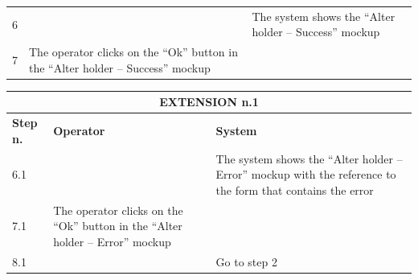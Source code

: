 {{{\begin{center}
\begin{tabular}{|p{2cm}|p{6cm}|p{6cm}|}
				\vspace{1mm} \vspace{1mm} \\
			\hline
				\vspace{1mm} 6 \vspace{1mm} &
				\vspace{1mm} \vspace{1mm} & 
				\vspace{1mm} The system shows  the “Alter holder – Success”  mockup\vspace{1mm} \\
			\hline
				\vspace{1mm} 7 \vspace{1mm} &
				\vspace{1mm} The operator clicks on the “Ok” button in the “Alter holder – Success”  mockup\vspace{1mm} & 
				\vspace{1mm} \vspace{1mm} \\
			\hline
			\end{tabular}

			\begin{tabular}{|p{2cm}|p{6cm}|p{6cm}|}
			\hline
				\multicolumn{3}{|c|}{EXTENSION n.1} \\
			\hline
				\centering \vspace{1mm} \bfseries{Step n.} \vspace{1mm} & \vspace{1mm} \bfseries{Operator} \vspace{1mm} & \vspace{1mm} \bfseries{System} \vspace{1mm}\\
			\hline
				\vspace{1mm} 6.1 \vspace{1mm} &
				\vspace{1mm} \vspace{1mm} & 
				\vspace{1mm} The system shows the “Alter holder – Error”  mockup with the reference to the form that contains the error \vspace{1mm} \\
			\hline
				\vspace{1mm} 7.1 \vspace{1mm} &
				\vspace{1mm} The operator clicks on the “Ok” button in the “Alter holder – Error”  mockup \vspace{1mm} & 
				\vspace{1mm} \vspace{1mm} \\
			\hline
				\vspace{1mm} 8.1 \vspace{1mm} &
				\vspace{1mm} \vspace{1mm} & 
				\vspace{1mm} Go to step 2\vspace{1mm} \\
			\hline
			\end{tabular}


\end{center}}}}
